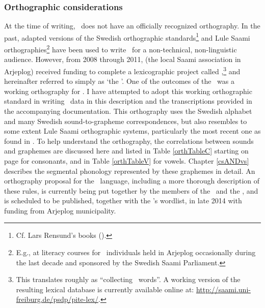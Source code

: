 \subsubsection{Orthographic considerations}\label{orthography}
At the time of writing, \PS\ does not have an officially recognized orthography. In the past, adapted versions of the Swedish orthographic standards\footnote{Cf. Lars Rensund’s books (\citeyear{Rensund1982,Rensund1986}).} 
and Lule Saami orthographies\footnote{E.g., at literacy courses for \PS\ individuals held in Arjeplog occasionally during the last decade and sponsored by the Swedish Saami Parliament.} 
have been used to write \PS\ for a non-technical, non-linguistic audience. However, from 2008 through 2011,  (the local Saami association in Arjeplog) received funding to complete a lexicographic project called ,\footnote{This translates roughly as “collecting \PS\ words”. A working version of the resulting lexical database is currently available online at: \href{http://saami.uni-freiburg.de/psdp/pite-lex/}{http://saami.uni-freiburg.de/psdp/pite-lex/}.} 
\citep[cf.][]{insamlingPS2011} 
and hereinafter referred to simply as ‘the \WLP’. 
One of the outcomes of the \WLP\ was a working orthography for \PS. 
I have attempted to adopt this working orthographic standard in writing \PS\ data in this description and the transcriptions provided in the accompanying documentation. This orthography uses the Swedish alphabet and many Swedish sound-to-grapheme correspondences, but also resembles to some extent Lule Saami orthographic systems, particularly the most recent one as found in \citet{KorhonenO2005}. To help understand the orthography, the correlations between sounds and graphemes are discussed here and listed in Table \ref{orthTableC} starting on page \pageref{orthTableCbegin} for consonants, and in Table \vref{orthTableV} for vowels. %
Chapter \ref{csANDvs} describes the segmental phonology represented by these graphemes in detail. 
An orthography proposal for the \PS\ language, including a more thorough description of these rules, is currently being put together by the members of the \WLP\ and the \PSDP, and is scheduled to be published, together with the \WLP’s wordlist, in late 2014 with funding from Arjeplog municipality. 

